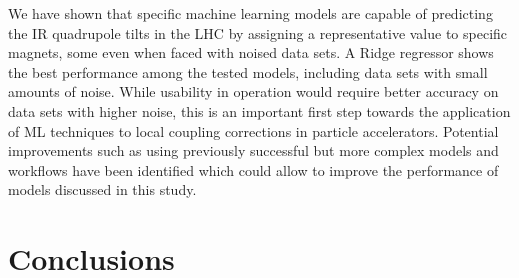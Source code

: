 We have shown that specific machine learning models are capable of predicting the IR quadrupole tilts in the LHC by assigning a representative value to specific magnets, some even when faced with noised data sets.
A Ridge regressor shows the best performance among the tested models, including data sets with small amounts of noise.
While usability in operation would require better accuracy on data sets with higher noise, this is an important first step towards the application of ML techniques to local coupling corrections in particle accelerators.
Potential improvements such as using previously successful but more complex models and workflows have been identified which could allow to improve the performance of models discussed in this study.








\section{Conclusions}

